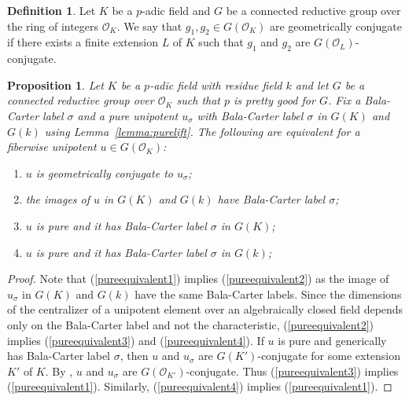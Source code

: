 \documentclass[11pt, letterpaper,english]{amsart}
\theoremstyle{plain}
\newtheorem{proposition}[lem]{Proposition}
\theoremstyle{definition}
\newtheorem{defn}[lem]{Definition}
\numberwithin{equation}{section}
\numberwithin{lem}{section}
\newcommand{\cO}{\mathcal{O}}
\begin{document}
\begin{defn}
Let $K$ be a $p$-adic field and $G$ be a connected reductive group over the ring of integers $\cO_K$.  
We say that $g_1,g_2 \in G(\cO_K)$ are geometrically conjugate if there exists a finite extension $L$ of $K$ such that $g_1$ and $g_2$ are $G(\cO_L)$-conjugate.
\end{defn}

\begin{proposition} \label{prop:pureequivalent}
Let $K$ be a $p$-adic field with residue field $k$ and let $G$ be a connected reductive group over $\cO_K$ such that $p$ is pretty good for $G$. Fix a Bala-Carter label $\sigma$ and a pure unipotent $u_\sigma$ with Bala-Carter label $\sigma$ in $G(K)$ and $G(k)$ using Lemma~\ref{lemma:purelift}.
The following are equivalent for a fiberwise unipotent $u \in G(\cO_K)$:
\begin{enumerate}
    \item  \label{pureequivalent1} $u$ is 
    geometrically conjugate to $u_{\sigma}$; 
    \item \label{pureequivalent2} the images of $u$ in $G(K)$ and $G(k)$ have Bala-Carter label $\sigma$;
    \item \label{pureequivalent3}  $u$ is pure and it has Bala-Carter label $\sigma$ in $G(K)$;
    \item  \label{pureequivalent4}  $u$ is pure and it has Bala-Carter label $\sigma$ in $G(k)$;
\end{enumerate}
\end{proposition}

\begin{proof}
Note that
(\ref{pureequivalent1}) implies (\ref{pureequivalent2}) as the image of $u_{\sigma}$ in $G(K)$ and $G(k)$ have the same Bala-Carter labels.  Since the dimensions of the centralizer of a unipotent element over an algebraically closed field depends only on the Bala-Carter label and not the characteristic, (\ref{pureequivalent2}) implies (\ref{pureequivalent3}) and (\ref{pureequivalent4}).  If $u$ is pure and generically has Bala-Carter label $\sigma$, then $u$ and $u_\sigma$ are $G(K')$-conjugate for some extension $K'$ of $K$.  By
\cite[Theorem 5.11]{cotner}, $u$ and $u_\sigma$ are $G(\cO_{K'})$-conjugate.  
Thus (\ref{pureequivalent3}) implies (\ref{pureequivalent1}).  Similarly, (\ref{pureequivalent4}) implies (\ref{pureequivalent1}).
\end{proof}
\end{document}

